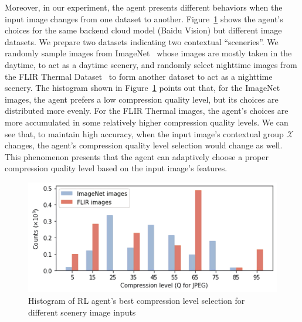 Moreover, in our experiment, the agent presents different behaviors when the input image changes from one dataset to another. Figure~\ref{fig: dataset_change} shows the agent's choices for the same backend cloud model (Baidu Vision) but different image datasets. We prepare two datasets indicating two contextual ``sceneries''. We randomly sample images from ImageNet~\cite{ImageNet} whose images are mostly taken in the daytime, to act as a daytime scenery, and randomly select nighttime images from the FLIR Thermal Dataset~\cite{FLIR} to form another dataset to act as a nighttime scenery. The histogram shown in Figure~\ref{fig: dataset_change} points out that, for the ImageNet images, the agent prefers a low compression quality level, but its choices are distributed more evenly. For the FLIR Thermal images, the agent's choices are more accumulated in some relatively higher compression quality levels. We can see that, to maintain high accuracy, when the input image's contextual group $ \mathcal{X} $ changes, the agent's compression quality level selection would change as well. This phenomenon presents that the agent can adaptively choose a proper compression quality level based on the input image's features. %

\begin{figure}[!t]
    \includegraphics[width=0.8\linewidth]{figures/dataset_change.pdf}
    \caption{Histogram of RL agent's best compression level selection for different scenery image inputs}
    \label{fig: dataset_change}
\end{figure}


